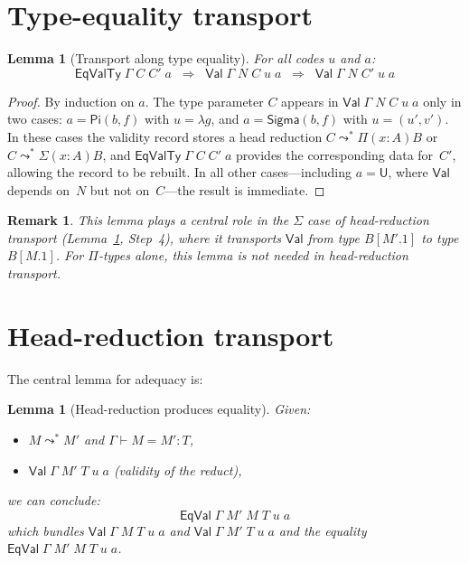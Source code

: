 \documentclass[11pt]{article}
\newcommand{\conveq}[4]{#1 \vdash #2 = #3 : #4}
\newcommand{\Pitype}[2]{\Pi(#1)#2}
\newcommand{\substone}[2]{#1[#2]}
\newcommand{\U}{\mathsf{U}}
\newcommand{\PiC}[2]{\mathsf{Pi}(#1,#2)}
\newcommand{\SigmaC}[2]{\mathsf{Sigma}(#1,#2)}
\newcommand{\Red}{\mathrel{\leadsto^*}}
\newcommand{\Sigmatype}[2]{\Sigma(#1)#2}
\newcommand{\Val}{\mathsf{Val}}
\newcommand{\EqVal}{\mathsf{EqVal}}
\newcommand{\EqValTy}{\mathsf{EqValTy}}
\newcommand{\pj}[2]{#1\mbox{.}#2}
\newtheorem{lemma}[theorem]{Lemma}
\newtheorem{remark}[theorem]{Remark}
\begin{document}
\section{Type-equality transport}

\begin{lemma}[Transport along type equality]\label{lem:transport}
For all codes $u$ and $a$:
\[
  \EqValTy\;\Gamma\;C\;C'\;a \;\;\Longrightarrow\;\;
  \Val\;\Gamma\;N\;C\;u\;a \;\;\Longrightarrow\;\;
  \Val\;\Gamma\;N\;C'\;u\;a
\]
\end{lemma}

\begin{proof}
By induction on $a$.  The type parameter $C$ appears in $\Val\;\Gamma\;N\;C\;u\;a$
only in two cases: $a = \PiC{b}{f}$ with $u = \lambda g$, and
$a = \SigmaC{b}{f}$ with $u = (u',v')$.  In these cases the validity
record stores a head reduction $C \Red \Pitype{x{:}A}{B}$
or $C \Red \Sigmatype{x{:}A}{B}$, and $\EqValTy\;\Gamma\;C\;C'\;a$
provides the corresponding data for~$C'$, allowing
the record to be rebuilt.  In all other cases---including $a = \U$,
where $\Val$ depends on~$N$ but not on~$C$---the result is immediate.
\end{proof}

\begin{remark}
This lemma plays a central role in the $\Sigma$ case of
head-reduction transport (Lemma~\ref{lem:headred}, Step~4), where it
transports $\Val$ from type $\substone{B}{\pj{M'}{1}}$ to type
$\substone{B}{\pj{M}{1}}$.
For $\Pi$-types alone, this lemma is not needed in head-reduction transport.
\end{remark}

\section{Head-reduction transport}

The central lemma for adequacy is:

\begin{lemma}[Head-reduction produces equality]\label{lem:headred}
Given:
\begin{itemize}
\item $M \Red M'$ and $\conveq{\Gamma}{M}{M'}{T}$,
\item $\Val\;\Gamma\;M'\;T\;u\;a$ \quad (validity of the reduct),
\end{itemize}
we can conclude:
\[
  \EqVal\;\Gamma\;M'\;M\;T\;u\;a
\]
which bundles $\Val\;\Gamma\;M\;T\;u\;a$ and $\Val\;\Gamma\;M'\;T\;u\;a$
and the equality $\EqVal\;\Gamma\;M'\;M\;T\;u\;a$.
\end{lemma}
\end{document}
